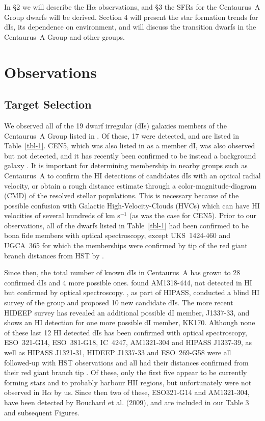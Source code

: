 \documentclass[preprint]{aastex}
\begin{document}
In \S 2 we will describe the H$\alpha$ observations, and \S 3 the SFRs 
for the Centaurus~A Group dwarfs will be derived. Section 4 will present the star
formation trends for dIs, its dependence on environment, and will discuss the
transition dwarfs in the Centaurus~A Group and other groups.

\section{Observations}

\subsection{Target Selection}

We observed all of the 19 dwarf irregular (dIs) galaxies members 
of the Centaurus~A Group listed in \citet{cfcq97}. 
Of these, 17 were detected,
and are listed in Table~\ref{tbl-1}. CEN5, which was also listed in \citet{cfcq97} as
a member dI,  was also observed but not detected,
and it has recently been confirmed to be instead a background galaxy 
\citep{bdj04}.
It is important for determining 
membership in nearby groups such as Centaurus~A to confirm the HI detections
of candidates dIs with an optical radial velocity, or obtain a rough distance
estimate through a color-magnitude-diagram (CMD) of the resolved stellar 
populations. This is necessary because of the possible confusion with 
Galactic High-Velocity-Clouds (HVCs) which can have 
HI velocities of several hundreds of km s$^{-1}$ (as was the case for CEN5).
Prior to our observations, all of the dwarfs listed in Table~\ref{tbl-1} 
had been confirmed 
to be bona fide members with optical spectroscopy, except  
UKS~1424-460 and UGCA~365 for which the memberships were confirmed
by tip of the red giant branch distances from HST by \citet{k02, k07}.

Since then, the total number of known dIs in Centaurus~A has grown
to 28 confirmed dIs and 4 more possible ones.
\citet{jfb98} found AM1318-444, not detected in HI but confirmed by optical
spectroscopy. \citet{b99}, as part of HIPASS, conducted a blind HI
survey of the group and proposed 10 new candidate dIs. 
The more recent HIDEEP survey \citep{m03} has revealed an additional possible dI member, 
J1337-33, and \citet{hke00} 
shows an HI detection for one more possible dI member, KK170. 
Although none 
of these last 12 HI detected dIs has been confirmed with optical spectroscopy,
ESO~321-G14, ESO~381-G18, IC~4247, AM1321-304 and HIPASS J1337-39, 
as well as HIPASS J1321-31, HIDEEP J1337-33 and ESO~269-G58 were all
followed-up with HST observations and all had their distances confirmed 
from their red giant branch tip \citep{k02, k07, g07}. 
Of these, only the first five appear to be
currently forming stars and to probably harbour HII regions, but unfortunately
were not observed in H$\alpha$ by us. Since then two of these, ESO321-G14 and 
AM1321-304, have been detected by Bouchard et al. (2009), and are included
in our Table 3 and subsequent Figures. 
\end{document}
